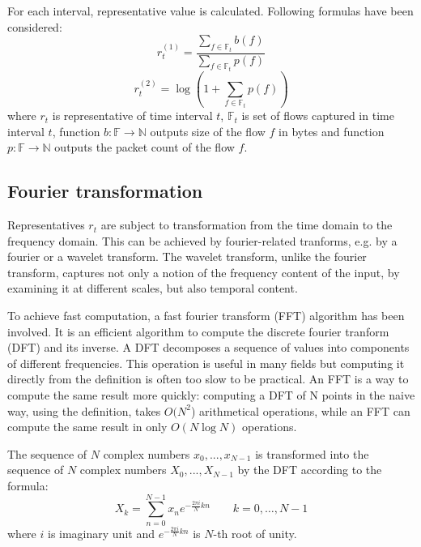\documentclass[a4paper,journal]{IEEEtran}
\begin{document}
For each interval,
representative value is calculated. Following formulas have been considered:
\begin{equation}
r_t^{(1)} = \frac{\sum\limits_{f\in \mathbb{F}_t}b(f)}{\sum\limits_{f\in \mathbb{F}_t}p(f)}
\end{equation}
\begin{equation}
r_t^{(2)} = \log(1+\sum\limits_{f\in \mathbb{F}_t}p(f))
\end{equation}
where $r_t$ is representative of time interval $t$, $\mathbb{F}_t$ is set of flows captured in time 
interval $t$, function $b:\mathbb{F} \rightarrow \mathbb{N}$ outputs size of the flow $f$ in bytes and function 
$p:\mathbb{F} \rightarrow \mathbb{N}$ outputs the packet count of the flow $f$.


\subsection{Fourier transformation}
Representatives $r_t$ are subject to transformation from the time domain to the
frequency domain.
This can be achieved by fourier-related
tranforms, e.g. by a fourier or a wavelet transform.
The wavelet transform, unlike the fourier transform, captures
not only a notion of the frequency content of the input, by
examining it at different scales, but also temporal content.

To achieve fast computation, a fast fourier transform (FFT) algorithm 
has been involved.
It is an efficient algorithm to compute the discrete fourier tranform (DFT) and
its inverse.
A DFT decomposes a sequence of values into components of
different frequencies. 
This operation is useful in many fields but computing it directly from the
definition is often too slow to be practical.
An FFT is a way to compute the same result more quickly: 
computing a DFT of N points in the naive way, using the definition, takes
$O(N^2$) arithmetical operations, 
while an FFT can compute the same result in only $ O(N \log N)$ operations.

The sequence of $N$ complex numbers $x_0, ..., x_{N−1}$ is transformed into the
sequence of $N$ complex numbers $X_0, ..., X_{N−1}$ by the DFT according to the
formula:
\begin{equation}
X_k = \sum_{n=0}^{N-1} x_n e^{-\frac{2 \pi i}{N} k n} \quad \quad k = 0, \dots, N-1
\end{equation}
where $i$ is imaginary unit and $e^{-\frac{2 \pi i}{N} k n}$ is $N$-th root of
unity. 
\end{document}
